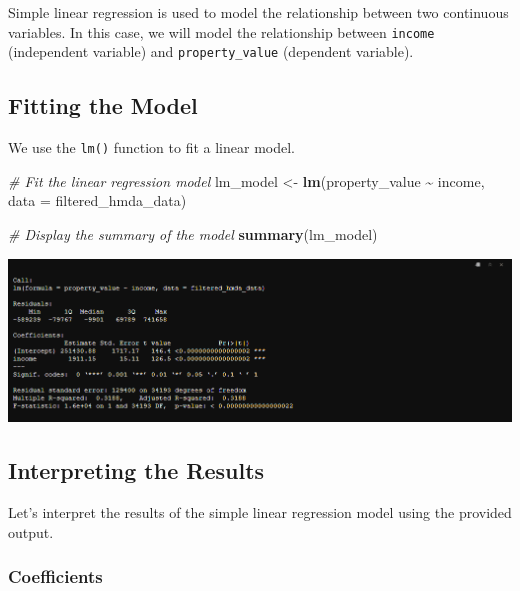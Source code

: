 \documentclass[
]{book}
\newenvironment{Shaded}{\begin{snugshade}}{\end{snugshade}}
\newcommand{\AttributeTok}[1]{\textcolor[rgb]{0.13,0.29,0.53}{#1}}
\newcommand{\CommentTok}[1]{\textcolor[rgb]{0.56,0.35,0.01}{\textit{#1}}}
\newcommand{\FunctionTok}[1]{\textcolor[rgb]{0.13,0.29,0.53}{\textbf{#1}}}
\newcommand{\NormalTok}[1]{#1}
\newcommand{\OtherTok}[1]{\textcolor[rgb]{0.56,0.35,0.01}{#1}}
\newcommand{\SpecialCharTok}[1]{\textcolor[rgb]{0.81,0.36,0.00}{\textbf{#1}}}
\begin{document}
Simple linear regression is used to model the relationship between two continuous variables. In this case, we will model the relationship between \texttt{income} (independent variable) and \texttt{property\_value} (dependent variable).

\hypertarget{fitting-the-model}{%
\subsection{Fitting the Model}\label{fitting-the-model}}

We use the \texttt{lm()} function to fit a linear model.

\begin{Shaded}
\begin{Highlighting}[]
\CommentTok{\# Fit the linear regression model}
\NormalTok{lm\_model }\OtherTok{\textless{}{-}} \FunctionTok{lm}\NormalTok{(property\_value }\SpecialCharTok{\textasciitilde{}}\NormalTok{ income, }\AttributeTok{data =}\NormalTok{ filtered\_hmda\_data)}

\CommentTok{\# Display the summary of the model}
\FunctionTok{summary}\NormalTok{(lm\_model)}
\end{Highlighting}
\end{Shaded}

\includegraphics{images/regression_summary.PNG}

\hypertarget{interpreting-the-results}{%
\subsection{Interpreting the Results}\label{interpreting-the-results}}

Let's interpret the results of the simple linear regression model using the provided output.

\hypertarget{coefficients}{%
\subsubsection*{Coefficients}\label{coefficients}}
\end{document}
